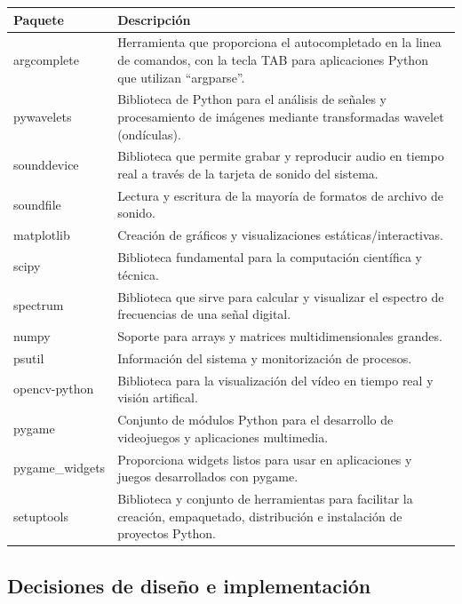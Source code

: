 \begin{center}
\begin{tabular}{|p{2.5cm}|p{12.6cm}|}
    \hline
    \textbf{Paquete} & \textbf{Descripción } \\
    \hline
    argcomplete & Herramienta que proporciona el autocompletado en la linea de comandos, con la tecla TAB para aplicaciones Python que utilizan ``argparse''. \\
    \hline
    pywavelets & Biblioteca de Python para el análisis de señales y procesamiento de imágenes mediante transformadas wavelet (ondículas). \\
    \hline
    sounddevice & Biblioteca que permite grabar y reproducir audio en tiempo real a través de la tarjeta de sonido del sistema. \\
    \hline
    soundfile & Lectura y escritura de la mayoría de formatos de archivo de sonido. \\
    \hline
    matplotlib & Creación de gráficos y visualizaciones estáticas/interactivas. \\
    \hline
    scipy & Biblioteca fundamental para la computación científica y técnica. \\
    \hline
    spectrum & Biblioteca que sirve para calcular y visualizar el espectro de frecuencias de una señal digital. \\
    \hline
    numpy & Soporte para arrays y matrices multidimensionales grandes. \\
    \hline
    psutil & Información del sistema y monitorización de procesos. \\
    \hline
    opencv-python & Biblioteca para la visualización del vídeo en tiempo real y visión artifical. \\
    \hline
    pygame & Conjunto de módulos Python para el desarrollo de videojuegos y aplicaciones multimedia. \\
    \hline
    pygame\_widgets & Proporciona widgets listos para usar en aplicaciones y juegos desarrollados con pygame. \\
    \hline
    setuptools & Biblioteca y conjunto de herramientas para facilitar la creación, empaquetado, distribución e instalación de proyectos Python. \\
    \hline
\end{tabular}
\label{tab:paquetes}
\end{center}

\newpage

\subsection{Decisiones de diseño e implementación}

